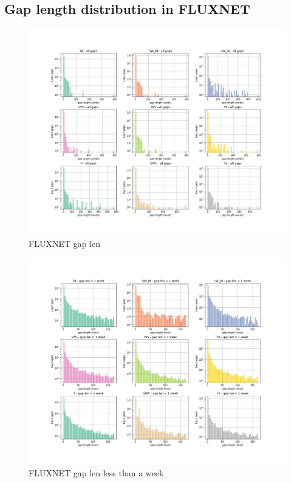 \documentclass{article}
\newcommand{\imgwidth}{6in}
\let\Oldsubsection\subsection
\renewcommand{\subsection}{\FloatBarrier\Oldsubsection}
\begin{document}
\subsection{Gap length distribution in FLUXNET}
\begin{figure}
\centerline{\includegraphics[width=\imgwidth]{gap_len_dist}}
\caption{FLUXNET gap len}
\label{fig:gap_len_dist_small}
\end{figure}
\begin{figure}
\centerline{\includegraphics[width=\imgwidth]{gap_len_dist_small}}
\caption{FLUXNET gap len less than a week}
\label{fig:gap_len_dist_small}
\end{figure}
\end{document}
